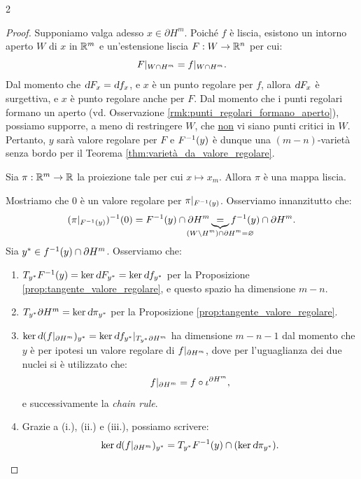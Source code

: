 \begin{multicols*}{2}
\begin{proof}
        Supponiamo valga adesso $x \in \partial H^m$. Poiché $f$ è liscia, esistono un intorno aperto $W$
        di $x$ in $\mathbb{R}^m$ e un'estensione liscia $F : W \to \mathbb{R}^n$ per cui:
        \[
            F\arrowvert_{W \cap H^m} = f\arrowvert_{W \cap H^m}.
        \]
        Dal momento che $\dif F_x = \dif f_x$, e $x$ è un punto regolare per $f$, allora $\dif F_x$ è surgettiva,
        e $x$ è punto regolare anche per $F$. Dal momento che i punti regolari formano un aperto (vd. Osservazione
        \ref{rmk:punti_regolari_formano_aperto}), possiamo supporre, a meno di restringere $W$, che \underline{non}
        vi siano punti critici in $W$. Pertanto, $y$ sarà valore regolare per $F$ e $F^{-1}(y)$ è dunque una $(m-n)$-varietà
        senza bordo per il Teorema \ref{thm:varietà_da_valore_regolare}. \smallskip

        Sia $\pi : \mathbb{R}^m \to \mathbb{R}$ la proiezione tale per cui $x \mapsto x_m$. Allora $\pi$ è una mappa liscia. \smallskip

        Mostriamo che $0$ è un valore regolare per $\pi\arrowvert_{F^{-1}(y)}$. Osserviamo innanzitutto che:
        \[
            (\restr{\pi}{F\inv(y)})\inv(0) = F\inv(y) \cap \partial H^m \underbrace{=}_{\mathclap{(W \setminus H^m) \cap \partial H^m = \emptyset}} f\inv(y) \cap \partial H^m.
        \]
        Sia $y^* \in f^{-1}(y) \cap \partial H^m$. Osserviamo che:
        \begin{enumerate}[(i.)]
            \item $T_{y^*} F\inv(y) = \ker \dif F_{y^*} = \ker \dif f_{y^*}$ per la Proposizione \ref{prop:tangente_valore_regolare}, e questo spazio
                  ha dimensione $m-n$.
            \item $T_{y^*} \partial H^m = \ker \dif \pi_{y^*}$ per la Proposizione \ref{prop:tangente_valore_regolare}.
            \item $\ker \dif (\restr{f}{\partial H^m})_{y^*} = \ker \restr{\dif f_{y^*}}{T_{y^*} \partial H^m}$ ha dimensione
                  $m-n-1$ dal momento che $y$ è per ipotesi un valore regolare di $f\arrowvert_{\partial H^m}$, dove per l'uguaglianza
                  dei due nuclei si è utilizzato che:
                  \[
                      f\arrowvert_{\partial H^m} = f \circ \iota^{\partial H^m},
                  \]
                  e successivamente la \textit{chain rule}.
            \item Grazie a (i.), (ii.) e (iii.), possiamo scrivere:
                  \[
                      \ker \dif (\restr{f}{\partial H^m})_{y^*} = T_{y^*} F\inv(y) \cap (\ker \dif \pi_{y^*}).
                  \]
        \end{enumerate}


\end{proof}
\end{multicols*}
